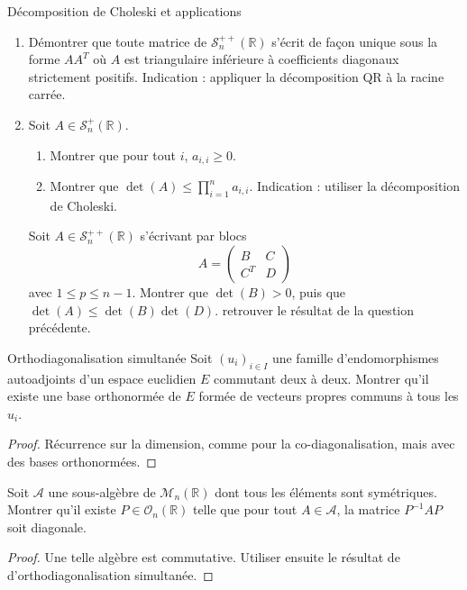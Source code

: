 \documentclass[french,a4paper]{article}
\newcommand{\R}{\mathbb{R}}
\newcommand{\inv}{^{-1}}
\theoremstyle{plain}
\theoremstyle{definition}
\theoremstyle{remark}
\begin{document}
\begin{ex}[Châteaux]{Décomposition de Choleski et applications}
	\begin{enumerate}
		\item Démontrer que toute matrice de $\mathcal{S}_n^{++}(\R)$ s'écrit de façon unique sous la forme $AA^T$ où $A$ est triangulaire inférieure à coefficients diagonaux strictement positifs. Indication : appliquer la décomposition QR à la racine carrée.
		\item Soit $A\in\mathcal{S}_n^{+}(\R)$.
		\begin{enumerate}[label=\alph*.]
			\item Montrer que pour tout $i$, $a_{i,i}\geqslant0$.
			\item Montrer que $\det(A)\leqslant\displaystyle\prod_{i=1}^{n}a_{i,i}$. Indication : utiliser la décomposition de Choleski.
		\end{enumerate}
		Soit $A\in\mathcal{S}_n^{++}(\R)$ s'écrivant par blocs $$A=\begin{pmatrix}
			B&C\\
			C^T&D
		\end{pmatrix}$$ avec $1\leqslant p\leqslant n-1$. Montrer que $\det(B)>0$, puis que $\det(A)\leqslant\det(B)\det(D)$. retrouver le résultat de la question précédente.
	\end{enumerate}
\end{ex}

\begin{ex}{Orthodiagonalisation simultanée}
	Soit $(u_i)_{i\in I}$ une famille d'endomorphismes autoadjoints d'un espace euclidien $E$ commutant deux à deux. Montrer qu'il existe une base orthonormée de $E$ formée de vecteurs propres communs à tous les $u_i$.
\end{ex}
\begin{proof}
	Récurrence sur la dimension, comme pour la co-diagonalisation, mais avec des bases orthonormées.
\end{proof}

\begin{ex}{}
	Soit $\mathcal{A}$ une sous-algèbre de $\mathcal{M}_n(\R)$ dont tous les éléments sont symétriques. Montrer qu'il existe $P\in\mathcal{O}_n(\R)$ telle que pour tout $A\in\mathcal{A}$, la matrice $P\inv AP$ soit diagonale.
\end{ex}
\begin{proof}
	Une telle algèbre est commutative. Utiliser ensuite le résultat de d'orthodiagonalisation simultanée.
\end{proof}
\end{document}
